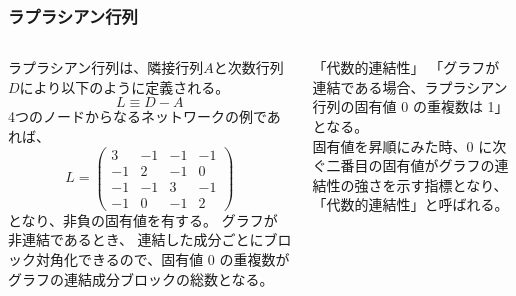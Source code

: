 \documentclass[11pt, dvipdfmx]{beamer}
\begin{document}
\begin{frame}
\frametitle{ラプラシアン行列}
\begin{columns}[totalwidth=1\textwidth]
ラプラシアン行列は、隣接行列$A$と次数行列$D$により以下のように定義される。
$$
L \equiv D-A
$$
4つのノードからなるネットワークの例であれば、
$$
L = \left( 
\begin{array}{cccc} 
 3 & -1 & -1 & -1 \\ 
-1 &  2 & -1 & 0 \\
-1 & -1 &  3 & -1 \\
-1 &  0 & -1 & 2 
\end{array} 
\right) 
$$
となり、非負の固有値を有する。
グラフが非連結であるとき、%
連結した成分ごとにブロック対角化できるので、固有値 0 の重複数がグラフの連結成分ブロックの総数となる。
\begin{block}{「代数的連結性」}
「グラフが連結である場合、ラプラシアン行列の固有値 0 の重複数は 1」となる。\\
固有値を昇順にみた時、0 に次ぐ二番目の固有値がグラフの連結性の強さを示す指標となり、「代数的連結性」と呼ばれる。
\end{block}
\end{columns}
\end{frame}
\end{document}
